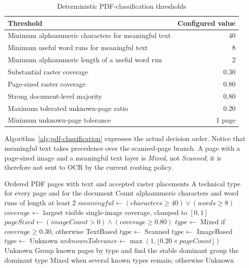 \begin{table}[!htbp]
	\centering
	\small
	\caption{Deterministic PDF-classification thresholds}
	\label{tab:pdf-thresholds}
	\begin{tabular}{p{7.8cm}r}
		\toprule
		Threshold & Configured value \\
		\midrule
		Minimum alphanumeric characters for meaningful text & 40 \\
		Minimum useful word runs for meaningful text & 8 \\
		Minimum alphanumeric length of a useful word run & 2 \\
		Substantial raster coverage & 0.30 \\
		Page-sized raster coverage & 0.80 \\
		Strong document-level majority & 0.80 \\
		Maximum tolerated unknown-page ratio & 0.20 \\
		Minimum unknown-page tolerance & 1 page \\
		\bottomrule
	\end{tabular}
\end{table}

Algorithm~\ref{alg:pdf-classification} expresses the actual decision order.
Notice that meaningful text takes precedence over the scanned-page branch. A
page with a page-sized image and a meaningful text layer is \emph{Mixed}, not
\emph{Scanned}; it is therefore not sent to OCR by the current routing policy.

\begin{algorithm}[!htbp]
	\caption{Deterministic technical PDF classification}
	\label{alg:pdf-classification}
	\begin{algorithmic}[1]
		\Require Ordered PDF pages with text and accepted raster placements
		\Ensure A technical type for every page and for the document
			\State Count alphanumeric characters and word runs of length at least 2
			\State $meaningful \gets (characters \geq 40) \lor (words \geq 8)$
			\State $coverage \gets$ largest visible single-image coverage, clamped to $[0,1]$
			\State $pageSized \gets (imageCount > 0) \land (coverage \geq 0.80)$
				\State $type \gets$ Mixed if $coverage \geq 0.30$, otherwise TextBased
				\State $type \gets$ Scanned
				\State $type \gets$ ImageBased
			\Else
				\State $type \gets$ Unknown
			\EndIf
		\EndFor
		\State $unknownTolerance \gets \max(1,\lfloor 0.20 \times pageCount \rfloor)$
			\State \Return Unknown
		\EndIf
		\State Group known pages by type and find the stable dominant group
			\State \Return the dominant type
		\EndIf
		\State \Return Mixed when several known types remain; otherwise Unknown
	\end{algorithmic}
\end{algorithm}

